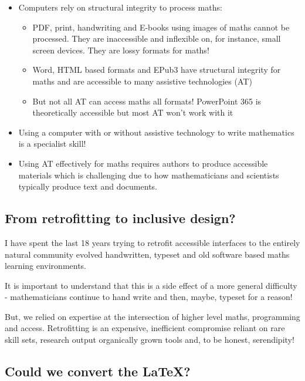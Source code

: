 \documentclass[
  12pt,
  a4paper]{extarticle}
\providecommand{\tightlist}{%
  \setlength{\itemsep}{0pt}\setlength{\parskip}{0pt}}
\renewcommand{\;}{\,}
\begin{document}
\begin{itemize}
\tightlist
\item
  Computers rely on structural integrity to process maths:

  \begin{itemize}
  \tightlist
  \item
    PDF, print, handwriting and E-books using images of maths cannot be processed. They are inaccessible and inflexible on, for instance, small screen devices. They are lossy formats for maths!
  \item
    Word, HTML based formats and EPub3 have structural integrity for maths and are accessible to many assistive technologies (AT)
  \item
    But not all AT can access maths all formats! PowerPoint 365 is theoretically accessible but most AT won't work with it
  \end{itemize}
\item
  Using a computer with or without assistive technology to write mathematics is a specialist skill!
\item
  Using AT effectively for maths requires authors to produce accessible materials which is challenging due to how mathematicians and scientists typically produce text and documents.
\end{itemize}

\hypertarget{from-retrofitting-to-inclusive-design}{%
\subsection{From retrofitting to inclusive design?}\label{from-retrofitting-to-inclusive-design}}

I have spent the last 18 years trying to retrofit accessible interfaces to the entirely natural community evolved handwritten, typeset and old software based maths learning environments.

It is important to understand that this is a side effect of a more general difficulty - mathematicians continue to hand write and then, maybe, typeset for a reason!

But, we relied on expertise at the intersection of higher level maths, programming and access. Retrofitting is an expensive, inefficient compromise reliant on rare skill sets, research output organically grown tools and, to be honest, serendipity!

\hypertarget{could-we-convert-the-latex}{%
\subsection{Could we convert the LaTeX?}\label{could-we-convert-the-latex}}
\end{document}
